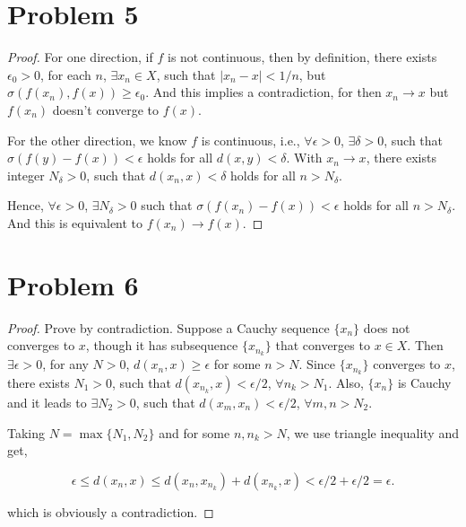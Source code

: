 \documentclass[12pt]{article}
\begin{document}
\section*{Problem 5}

\begin{proof}

For one direction, if $f$ is not continuous, then by definition, there exists $\epsilon_0 > 0$, for each $n$, $\exists x_n \in X$, such that $|x_n - x| < 1/n$, but $\sigma (f(x_n), f(x)) \geqslant \epsilon_0$. And this implies a contradiction, for then $x_n \rightarrow x$ but $f(x_n)$ doesn't converge to $f(x)$.

For the other direction, we know $f$ is continuous, i.e.,  $\forall \epsilon > 0$, $\exists \delta > 0$, such that $\sigma (f(y) - f(x)) < \epsilon$ holds for all $d(x, y) < \delta$. With $x_n \rightarrow x$, there exists integer $N_\delta > 0$, such that $d(x_n , x) < \delta$ holds for all $n > N_\delta$.

Hence, $\forall \epsilon > 0$, $\exists N_\delta > 0$ such that $\sigma (f(x_n) - f(x)) < \epsilon$ holds for all $n > N_\delta$. And this is equivalent to $f(x_n) \rightarrow f(x)$.

\end{proof}


\section*{Problem 6}

\begin{proof}

Prove by contradiction. Suppose a Cauchy sequence $\{x_n\}$ does not converges to $x$, though it has subsequence $\{x_{n_k}\}$ that converges to $x\in X$. Then $\exists \epsilon > 0$, for any $N > 0$, $d(x_n, x) \geqslant \epsilon$ for some $n > N$. Since $\{x_{n_k}\}$ converges to $x$, there exists $N_1 > 0$, such that $d(x_{n_k}, x) < \epsilon/2$, $\forall n_k > N_1$. Also, $\{x_n\}$ is Cauchy and it leads to $\exists N_2 > 0$, such that $d(x_m, x_n) <\epsilon/2$, $\forall m, n > N_2$. 

Taking $N = \max\{N_1, N_2\}$ and for some $n, n_k > N$, we use triangle inequality and get,

$$
\epsilon \leqslant d(x_n, x) \leqslant d(x_n, x_{n_k}) + d(x_{n_k}, x) < \epsilon/2 + \epsilon/2 = \epsilon.
$$

which is obviously a contradiction.

\end{proof}
\end{document}
